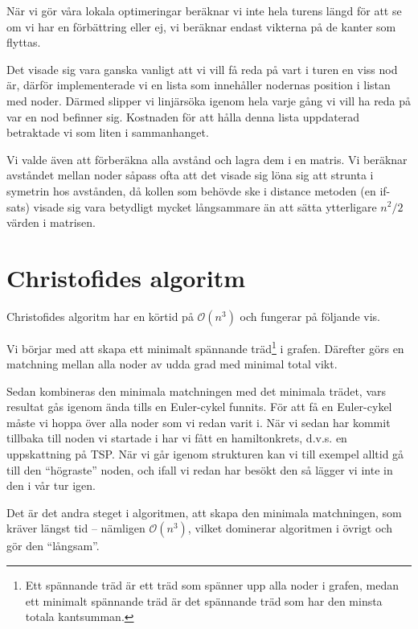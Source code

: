 \documentclass[a4paper,12pt]{article}
\renewcommand{\O}{\ensuremath{\mathcal{O}}}
\renewcommand{\*}{\ensuremath{\cdot}}
\begin{document}
När vi gör våra lokala optimeringar beräknar vi inte hela turens längd för att
se om vi har en förbättring eller ej, vi beräknar endast vikterna på de kanter
som flyttas.

Det visade sig vara ganska vanligt att vi vill få reda på vart i turen en viss
nod är, därför implementerade vi en lista som innehåller nodernas position i
listan med noder. Därmed slipper vi linjärsöka igenom hela varje gång vi vill ha
reda på var en nod befinner sig. Kostnaden för att hålla denna lista uppdaterad
betraktade vi som liten i sammanhanget.

Vi valde även att förberäkna alla avstånd och lagra dem i en matris. Vi beräknar
avståndet mellan noder såpass ofta att det visade sig löna sig att strunta i
symetrin hos avstånden, då kollen som behövde ske i distance metoden (en
if-sats) visade sig vara betydligt mycket långsammare än att sätta ytterligare
$n^2/2$ värden i matrisen.



\section{Christofides algoritm} 

Christofides algoritm har en körtid på $\O(n^3)$ och fungerar på följande vis.

Vi börjar med att skapa ett minimalt spännande träd\footnote{Ett spännande träd
är ett träd som spänner upp alla noder i grafen, medan ett minimalt spännande
träd är det spännande träd som har den minsta totala kantsumman.} i grafen.
Därefter görs en matchning mellan alla noder av udda grad med minimal total
vikt.  

Sedan kombineras den minimala matchningen med det minimala trädet, vars resultat
gås igenom ända tills en Euler-cykel funnits. För att få en Euler-cykel måste vi
hoppa över alla noder som vi redan varit i. När vi sedan har kommit tillbaka
till noden vi startade i har vi fått en hamiltonkrets, d.v.s. en uppskattning på
TSP.  När vi går igenom strukturen kan vi till exempel alltid gå till den
``högraste'' noden, och ifall vi redan har besökt den så lägger vi inte in den i
vår tur igen.

Det är det andra steget i algoritmen, att skapa den minimala matchningen, som
kräver längst tid -- nämligen $\O(n^3)$, vilket dominerar algoritmen i övrigt och
gör den ``långsam''.
\end{document}
